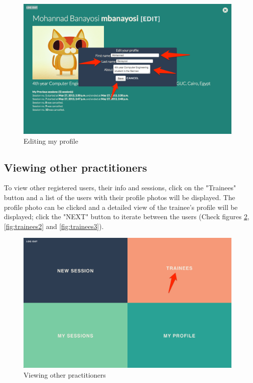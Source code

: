 \begin{figure}[htbp]
\centering 
\includegraphics[width=1.0\linewidth]{steps/EditProfile2} 
\caption{Editing my profile} 
\label{fig:editprofile2} 
\end{figure} 

\subsection{Viewing other practitioners}
To view other registered users, their info and sessions, click on the "Trainees" button and a list of the users with their profile photos will be displayed. The profile photo can be clicked and a detailed view of the trainee's profile will be displayed; click the "NEXT" button to iterate between the users (Check figures \ref{fig:trainees}, \ref{fig:trainees2} and \ref{fig:trainees3}).

\begin{figure}[htbp]
\centering 
\includegraphics[width=1.0\linewidth]{steps/Trainees} 
\caption{Viewing other practitioners} 
\label{fig:trainees} 
\end{figure} 


